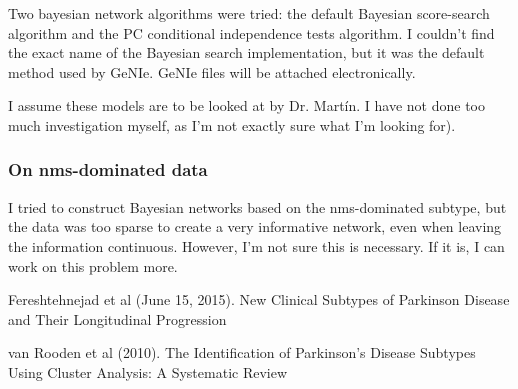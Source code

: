 \documentclass[letterpaper,12pt]{article}
\begin{document}
Two bayesian network algorithms were tried: the default Bayesian score-search
algorithm and the PC conditional independence tests algorithm. I couldn't find
the exact name of the Bayesian search implementation, but it was the default
method used by GeNIe. GeNIe files will be attached electronically.

I assume these models are to be looked at by Dr. Mart\'in. I have not done too
much investigation myself, as I'm not exactly sure what I'm looking for).

\subsubsection{On nms-dominated data}
I tried to construct Bayesian networks based on the nms-dominated subtype, but
the data was too sparse to create a very informative network, even when leaving
the information continuous. However, I'm not sure this is necessary. If it is,
I can work on this problem more.

\begin{thebibliography}{9}

Fereshtehnejad et al (June 15, 2015). New Clinical Subtypes of Parkinson
Disease and Their Longitudinal Progression

van Rooden et al (2010). The Identification of Parkinson's Disease Subtypes
Using Cluster Analysis: A Systematic Review

\end{thebibliography}
\end{document}
